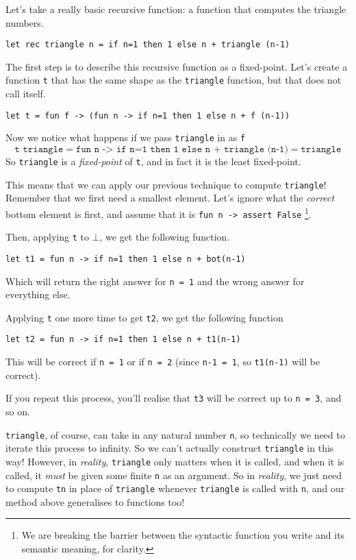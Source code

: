Let's take a really basic recursive function: a function that computes the triangle numbers. 
\begin{verbatim}
let rec triangle n = if n=1 then 1 else n + triangle (n-1)
\end{verbatim}
The first step is to describe this recursive function as a fixed-point. Let's create a function \texttt{t} that has the same shape as the \texttt{triangle} function, but that does not call itself.
\begin{verbatim}
let t = fun f -> (fun n -> if n=1 then 1 else n + f (n-1))
\end{verbatim}
Now we notice what happens if we pass \texttt{triangle} in as \texttt{f}
\[\texttt{t triangle} = \texttt{fun n -> if n=1 then 1 else n + triangle (n-1)} = \texttt{triangle}\]
So \texttt{triangle} is a \textit{fixed-point} of \texttt{t}, and in fact it is the least fixed-point.

This means that we can apply our previous technique to compute \texttt{triangle}! Remember that we first need a smallest element. Let's ignore what the \textit{correct} bottom element is first, and assume that it is \texttt{fun n -> assert False} \footnote{We are breaking the barrier between the syntactic function you write and its semantic meaning, for clarity.}.

Then, applying \texttt{t} to $\bot$, we get the following function. 
\begin{verbatim}
let t1 = fun n -> if n=1 then 1 else n + bot(n-1)
\end{verbatim}
Which will return the right answer for \texttt{n = 1} and the wrong answer for everything else.

Applying \texttt{t} one more time to get \texttt{t2}, we get the following function
\begin{verbatim}
let t2 = fun n -> if n=1 then 1 else n + t1(n-1)
\end{verbatim}
This will be correct if \texttt{n = 1} or if \texttt{n = 2} (since \texttt{n-1 = 1}, so \texttt{t1(n-1)} will be correct). 

If you repeat this process, you'll realise that \texttt{t3} will be correct up to \texttt{n = 3}, and so on.

\texttt{triangle}, of course, can take in any natural number \texttt{n}, so technically we need to iterate this process to infinity. So we can't actually construct \texttt{triangle} in this way! However, in \textit{reality}, \texttt{triangle} only matters when it is called, and when it is called, it \textit{must} be given some finite \texttt{n} as an argument. So in \textit{reality}, we just need to compute \texttt{tn} in place of \texttt{triangle} whenever \texttt{triangle} is called with \texttt{n}, and our method above generalises to functions too!

